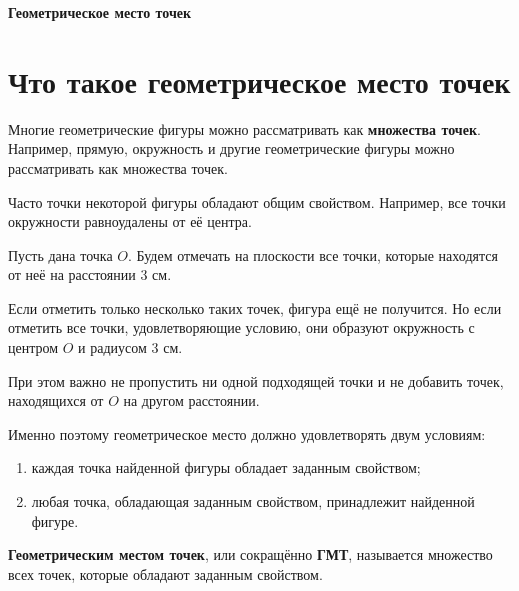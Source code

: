 
\begin{center}
			{\fontsize{25}{30}\selectfont\bfseries\sffamily\color{Primary}
				Геометрическое место точек}
		\end{center}
	
	\vspace{0.5em}
	
	\section{Что такое геометрическое место точек}
	
		Многие геометрические фигуры можно рассматривать как \textbf{множества точек}.
		Например, прямую, окружность и другие геометрические фигуры можно
		рассматривать как множества точек.
	
		Часто точки некоторой фигуры обладают общим свойством. Например, все точки
		окружности равноудалены от её центра.
	
	Пусть дана точка \(O\). Будем отмечать на плоскости все точки, которые
	находятся от неё на расстоянии \(3\) см.
	
	Если отметить только несколько таких точек, фигура ещё не получится.
	Но если отметить все точки, удовлетворяющие условию, они образуют окружность
	с центром \(O\) и радиусом \(3\) см.

	\gmtcirclefigure
	
	При этом важно не пропустить ни одной подходящей точки и не добавить точек,
	находящихся от \(O\) на другом расстоянии.
	
	Именно поэтому геометрическое место должно удовлетворять двум условиям:
	
	\begin{enumerate}
		\item каждая точка найденной фигуры обладает заданным свойством;
		\item любая точка, обладающая заданным свойством, принадлежит найденной фигуре.
	\end{enumerate}
	
	\begin{definitionbox}
		\textbf{Геометрическим местом точек}, или сокращённо \textbf{ГМТ},
			называется множество всех точек, которые обладают заданным свойством.
	\end{definitionbox}
	
